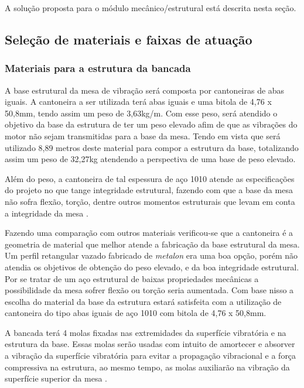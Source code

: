 \label{desenvolvimento_estrutura}

A solução proposta para o módulo mecânico/estrutural está descrita nesta seção.

\subsection*{Seleção de materiais e faixas de atuação}

\subsubsection*{\textbf{Materiais para a estrutura da bancada}}

A base estrutural da mesa de vibração será composta por cantoneiras de abas iguais. A cantoneira a ser utilizada terá abas iguais e uma bitola de 4,76 x 50,8mm, tendo assim um peso de 3,63kg/m. Com esse peso, será atendido o objetivo da base da estrutura de ter um peso elevado afim de que as vibrações do motor não sejam transmitidas para a base da mesa. Tendo em vista que será utilizado 8,89 metros deste material para compor a estrutura da base, totalizando assim um peso de 32,27kg atendendo a perspectiva de uma base de peso elevado.

Além do peso, a cantoneira de tal espessura de aço 1010 atende as especificações do projeto no que tange integridade estrutural, fazendo com que a base da mesa não sofra flexão, torção, dentre outros momentos estruturais que levam em conta a integridade da mesa \cite{acos_continente}.

Fazendo uma comparação com outros materiais verificou-se que a cantoneira é a geometria de material que melhor atende a fabricação da base estrutural da mesa. Um perfil retangular vazado fabricado de \textit{metalon} era uma boa opção, porém não atendia os objetivos de obtenção do peso elevado, e da boa integridade estrutural. Por se tratar de um aço estrutural de baixas propriedades mecânicas a possibilidade da mesa sofrer flexão ou torção seria aumentada. Com base nisso a escolha do material da base da estrutura estará satisfeita com a utilização de cantoneira do tipo abas iguais de aço 1010 com bitola de 4,76 x 50,8mm.

  A bancada terá 4 molas fixadas nas extremidades da superfície vibratória e na estrutura da base. Essas molas serão usadas com intuito de amortecer e absorver a vibração da superfície vibratória para evitar a propagação vibracional e a força compressiva na estrutura, ao mesmo tempo, as molas auxiliarão na vibração da superfície superior da mesa \cite{mola_santos}.

